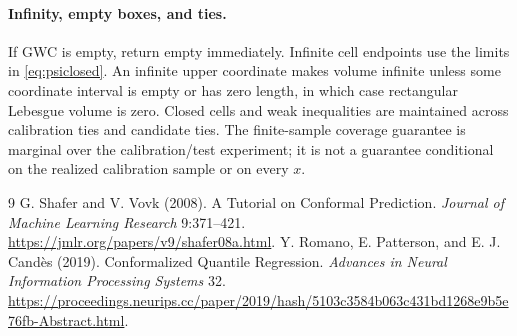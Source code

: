 \documentclass[11pt]{article}
\begin{document}
\paragraph{Infinity, empty boxes, and ties.}
If GWC is empty, return empty immediately. Infinite cell endpoints use the
limits in \eqref{eq:psiclosed}. An infinite upper coordinate makes volume
infinite unless some coordinate interval is empty or has zero length, in which
case rectangular Lebesgue volume is zero. Closed cells and weak inequalities
are maintained across calibration ties and candidate ties. The finite-sample
coverage guarantee is marginal over the calibration/test experiment; it is not
a guarantee conditional on the realized calibration sample or on every $x$.


\begin{thebibliography}{9}
 G. Shafer and V. Vovk (2008).
A Tutorial on Conformal Prediction. \emph{Journal of Machine Learning Research}
9:371--421. \url{https://jmlr.org/papers/v9/shafer08a.html}.
 Y. Romano, E. Patterson, and E. J. Cand\`es (2019).
Conformalized Quantile Regression. \emph{Advances in Neural Information
Processing Systems} 32.
\url{https://proceedings.neurips.cc/paper/2019/hash/5103c3584b063c431bd1268e9b5e76fb-Abstract.html}.
\end{thebibliography}
\end{document}
